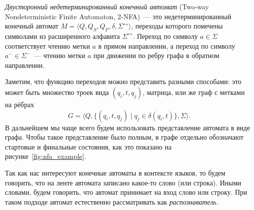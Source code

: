 \begin{definition}
    \label{def:TwoWayNondeterministicFiniteAutomata}
    \emph{Двусторонний недетерминированный конечный автомат} (Two-way Nondeterministic Finite Automaton, 2-NFA)~--- это недетерминированный конечный автомат $M = \langle Q, Q_S, Q_F, \delta, \Sigma^{\leftrightarrow} \rangle$, переходы которого помечены символами из расширенного алфавита $\Sigma^{\leftrightarrow}$.
    Переход по символу $a \in \Sigma$ соответствует чтению метки $a$ в прямом направлении, а переход по символу $a^{-} \in \Sigma^{-}$~--- чтению метки $a$ при движении по ребру графа в обратном направлении.
\end{definition}

Заметим, что функцию переходов можно представить разными способами: это может быть множество троек вида $(q_i, t, q_j)$, матрица, или же граф с метками на рёбрах
\[
G = \langle Q, \{(q_i, t, q_j) \mid q_j \in \delta(q_i, t)\}, \Sigma \rangle.
\]
В дальнейшем мы чаще всего будем использовать представление автомата в виде графа.
Чтобы такое представление было полным, в графе отдельно обозначают стартовые и финальные состояния, как это показано на рисунке~\ref{fig:nfa_example}.

Так как нас интересуют конечные автоматы в контексте языков, то будем говорить, что на ленте автомата записано какое-то слово (или строка).
Иными словами, будем говорить, что автомат принимает на вход слово или строку.
При таком подходе автомат естественно рассматривать как \emph{распознаватель}.


